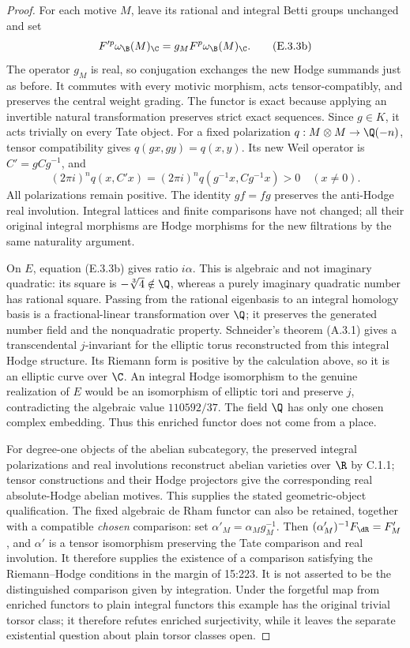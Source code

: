 \begin{proof}
For each motive $M$, leave its rational and integral Betti groups unchanged and set
\[
 F'^p\omega_{\B}(M)_\C=g_M F^p\omega_{\B}(M)_\C.
 \tag{E.3.3b}
\]
The operator $g_M$ is real, so conjugation exchanges the new Hodge summands just as before. It commutes with every motivic morphism, acts tensor-compatibly, and preserves the central weight grading. The functor is exact because applying an invertible natural transformation preserves strict exact sequences. Since $g\in K$, it acts trivially on every Tate object. For a fixed polarization $q:M\otimes M\to\Q(-n)$, tensor compatibility gives $q(gx,gy)=q(x,y)$. Its new Weil operator is $C'=gCg^{-1}$, and
\[
 (2\pi i)^nq(x,C'x)
 =(2\pi i)^nq(g^{-1}x,Cg^{-1}x)>0\quad(x\ne0).
\]
All polarizations remain positive. The identity $gf=fg$ preserves the anti-Hodge real involution. Integral lattices and finite comparisons have not changed; all their original integral morphisms are Hodge morphisms for the new filtrations by the same naturality argument.

On $E$, equation (E.3.3b) gives ratio $i\alpha$. This is algebraic and not imaginary quadratic: its square is $-\sqrt[3]{4}\notin\Q$, whereas a purely imaginary quadratic number has rational square. Passing from the rational eigenbasis to an integral homology basis is a fractional-linear transformation over $\Q$; it preserves the generated number field and the nonquadratic property. Schneider's theorem (A.3.1) gives a transcendental $j$-invariant for the elliptic torus reconstructed from this integral Hodge structure. Its Riemann form is positive by the calculation above, so it is an elliptic curve over $\C$. An integral Hodge isomorphism to the genuine realization of $E$ would be an isomorphism of elliptic tori and preserve $j$, contradicting the algebraic value $110592/37$. The field $\Q$ has only one chosen complex embedding. Thus this enriched functor does not come from a place.

For degree-one objects of the abelian subcategory, the preserved integral polarizations and real involutions reconstruct abelian varieties over $\R$ by C.1.1; tensor constructions and their Hodge projectors give the corresponding real absolute-Hodge abelian motives. This supplies the stated geometric-object qualification. The fixed algebraic de Rham functor can also be retained, together with a compatible \emph{chosen} comparison: set $\alpha'_M=\alpha_Mg_M^{-1}$. Then $(\alpha'_M)^{-1}F_{\dR}=F'_M$, and $\alpha'$ is a tensor isomorphism preserving the Tate comparison and real involution. It therefore supplies the existence of a comparison satisfying the Riemann--Hodge conditions in the margin of 15:223. It is not asserted to be the distinguished comparison given by integration. Under the forgetful map from enriched functors to plain integral functors this example has the original trivial torsor class; it therefore refutes enriched surjectivity, while it leaves the separate existential question about plain torsor classes open.
\end{proof}

